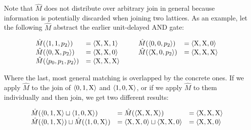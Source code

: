 Note that $\hat M$ does not distribute over arbitrary join in general because information is potentially discarded when joining two lattices. As an example, let the following $\hat M$ abstract the earlier unit-delayed AND gate:



\begin{equation*}
\begin{array}{llll}
  \hat M(\langle 1, 1, p_{2} \rangle) & = \langle \mathrm{X}, \mathrm{X}, 1 \rangle \qquad & \hat M(\langle 0, 0, p_{2} \rangle) & = \langle \mathrm{X}, \mathrm{X}, 0 \rangle \\
  \hat M(\langle 0, \mathrm{X}, p_{2} \rangle) & = \langle \mathrm{X}, \mathrm{X}, 0 \rangle & \hat M(\langle \mathrm{X}, 0, p_{2} \rangle) & = \langle \mathrm{X}, \mathrm{X}, \mathrm{X} \rangle \\
  \hat M(\langle p_{0}, p_{1}, p_{2} \rangle) & = \langle \mathrm{X}, \mathrm{X}, \mathrm{X} \rangle & &
\end{array}
\end{equation*}


\noindent Where the last, most general matching is overlapped by the concrete ones. If we apply $\hat M$ to the join of $\langle 0, 1, \mathrm{X} \rangle$ and $\langle 1, 0, \mathrm{X} \rangle$, or if we apply $\hat M$ to them individually and then join, we get two different results:

\begin{equation*}
\begin{array}{lll}
  \hat M(\langle 0, 1, \mathrm{X} \rangle \sqcup \langle 1, 0, \mathrm{X} \rangle) &= \hat M(\langle \mathrm{X}, \mathrm{X}, \mathrm{X} \rangle) &= \langle \mathrm{X}, \mathrm{X}, \mathrm{X} \rangle \\
  \hat M(\langle 0, 1, \mathrm{X} \rangle) \sqcup \hat M(\langle 1, 0, \mathrm{X} \rangle) &= \langle \mathrm{X}, \mathrm{X}, 0 \rangle \sqcup \langle \mathrm{X}, \mathrm{X}, 0 \rangle &= \langle \mathrm{X}, \mathrm{X}, 0 \rangle
\end{array}
\end{equation*}

